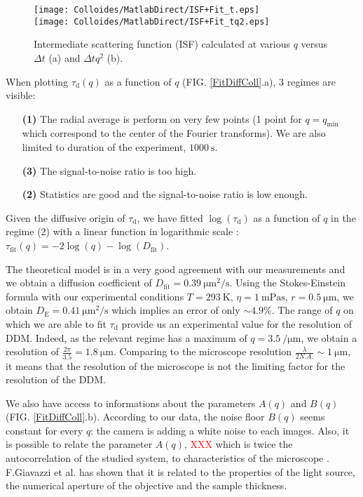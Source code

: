 \documentclass[%
 aip,
 jmp,%
 amsmath,amssymb,
reprint,%
]{revtex4-1}
\begin{document}
\begin{figure}
	\texttt{[image: Colloides/MatlabDirect/ISF+Fit\_t.eps]}\\
	\texttt{[image: Colloides/MatlabDirect/ISF+Fit\_tq2.eps]}
	\caption{Intermediate scattering function (ISF) calculated at various $q$ versus $\Delta t$ (a) and $\Delta tq^2$ (b).}
	\label{ISF}
\end{figure}

When plotting $\tau_\text{d}(q)$ as a function of $q$ (FIG. \ref{FitDiffColl}.a), 3 regimes are visible:

\begin{itemize}
\item[\textbf{(1)}] The radial average is perform on very few points (1 point for $q = q_\text{min}$ which correspond to the center of the Fourier transforms). We are also limited to duration of the experiment, $\SI{1000}{\second}$.
\item[\textbf{(3)}] The signal-to-noise ratio is too high.
\item[\textbf{(2)}] Statistics are good and the signal-to-noise ratio is low enough.
\end{itemize}


Given the diffusive origin of $\tau_\text{d}$, we have fitted $\log(\tau_\text{d})$ as a function of $q$ in the regime (2) with a linear function in logarithmic scale : $\tau_\text{fit}(q) = -2\log(q) - \log(D_\text{fit})$. 



The theoretical model is in a very good agreement with our measurements and we obtain a diffusion coefficient of $D_\text{fit} = \SI{0.39}{\micro\meter\squared\per\second}$. Using the Stokes-Einstein formula with our experimental conditions $T = \SI{293}{\kelvin}$, $\eta = \SI{1}{\milli\pascal\second}$, $r = \SI{0.5}{\micro\meter}$, we obtain $D_\text{E} = \SI{0.41}{\micro\meter\squared\per\second}$ which implies an error of only $\sim 4.9 \%$. The range of $q$ on which we are able to fit $\tau_\text{d}$ provide us an experimental value for the resolution of DDM. Indeed, as the relevant regime has a maximum of $q=\SI{3.5}{\per\micro\meter}$, we obtain a resolution of $\frac{2\pi}{3.5} = \SI{1.8}{\micro\meter}$. Comparing to the microscope resolution $\frac{\lambda}{2 N.A.} \sim \SI{1}{\micro\meter}$, it means that the resolution of the microscope is not the limiting factor for the resolution of the DDM.

We also have access to informations about the parameters $A(q)$ and $B(q)$ (FIG. \ref{FitDiffColl}.b). According to our data, the noise floor $B(q)$ seems constant for every $q$: the camera is adding a white noise to each images. Also, it is possible to relate the parameter $A(q)$, \textcolor{red}{XXX} which is twice the autocorrelation of the studied system, to characteristics of the microscope \citep{3_DDM3D}. F.Giavazzi et al. has shown that it is related to the properties of the light source, the numerical aperture of the objective and the sample thickness.
\end{document}
